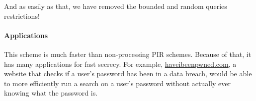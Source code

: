 {And as easily as that, we have removed the bounded and random queries restrictions!

\paragraph{Applications}
This scheme is much faster than non-processing PIR schemes. Because of that, it has many applications for fast secrecy. For example, \href{https://haveibeenpwned.com/}{haveibeenpwned.com}, a website that checks if a user's password has been in a data breach, would be able to more efficiently run a search on a user's password without actually ever knowing what the password is.
}
